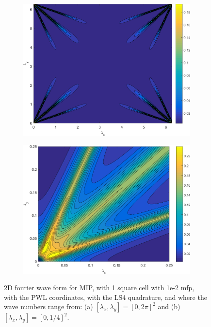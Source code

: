 \begin{figure}
\centering
	\begin{subfigure}[b]{0.48\textwidth}
		\centering
		\includegraphics[width=\textwidth]{figures/sec_DSA/SI_MIP_C=4_UPWLD1_LS4_x=1e-2_dydx=1_contour.png}
		\caption{}
	\end{subfigure}
	\hfill
	\begin{subfigure}[b]{0.495\textwidth}
		\centering
		\includegraphics[width=\textwidth]{figures/sec_DSA/SI_MIP_C=4_UPWLD1_LS4_x=1e-2_dydx=1_contour_ZOOM.png}
		\caption{}
	\end{subfigure}
\caption[2D fourier wave form for MIP with the PWL coordinates]{2D fourier wave form for MIP, with 1 square cell with 1e-2 mfp, with the PWL coordinates, with the LS4 quadrature, and where the wave numbers range from: (a) $[\lambda_x,\lambda_y]=[0,2 \pi]^2$ and (b) $[\lambda_x,\lambda_y]=[0,1/4]^2$.}
\label{fig::DSA_fourier_modes_showing_search_need}
\end{figure}

